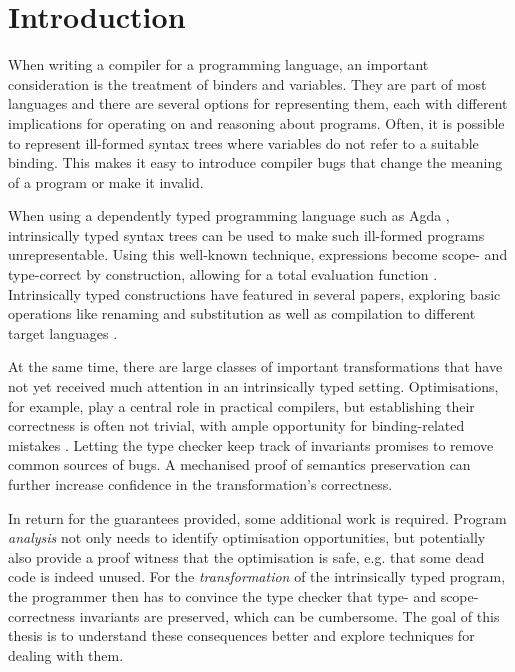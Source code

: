 \chapter{Introduction}
\label{ch:introduction}
    When writing a compiler for a programming language,
    an important consideration is the treatment of binders and variables.
    They are part of most languages and
    there are several options for representing them,
    each with different implications for operating on and reasoning about programs.
    Often, it is possible to represent ill-formed syntax trees
    where variables do not refer to a suitable binding.
    This makes it easy to introduce compiler bugs that change the meaning of a program
    or make it invalid.

    When using a dependently typed programming language such as Agda
    \cite{Norell2008Agda},
    intrinsically typed syntax trees can be used to
    make such ill-formed programs unrepresentable.
    Using this well-known technique,
    expressions become scope- and type-correct by construction,
    allowing for a total evaluation function
    \cite{Augustsson1999WellTypedInterpreter}.
    Intrinsically typed constructions have featured in several papers,
    exploring basic operations like renaming and substitution
    \cite{Allais2018UniverseOfSyntaxes}
    as well as compilation to different target languages
    \cite[online supplementary material]{Pickard2021CalculatingDependentlyTypedCompilers}.

    At the same time, there are large classes of important transformations
    that have not yet received much attention in an intrinsically typed setting.
    Optimisations, for example, play a central role in practical compilers,
    but establishing their correctness is often not trivial,
    with ample opportunity for binding-related mistakes
    \cite{SpectorZabusky2019EmbracingFormalizationGap}
    \cite{Maclaurin2022Foil}.
    Letting the type checker keep track of invariants
    promises to remove common sources of bugs.
    A mechanised proof of semantics preservation can further increase
    confidence in the transformation's correctness.

    In return for the guarantees provided, some additional work is required.
    Program \emph{analysis} not only needs to identify optimisation opportunities,
    but potentially also provide a proof witness that the optimisation is safe,
    e.g. that some dead code is indeed unused.
    For the \emph{transformation} of the intrinsically typed program,
    the programmer then has to convince the type checker
    that type- and scope-correctness invariants are preserved,
    which can be cumbersome.
    The goal of this thesis is to understand these consequences better
    and explore techniques for dealing with them.

